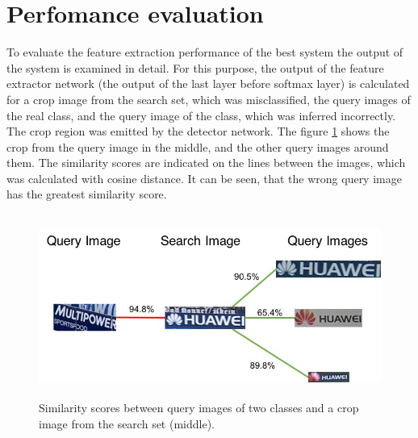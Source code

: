 \section{Perfomance evaluation}
To evaluate the feature extraction performance of the best system the output of the system is examined in detail. For this purpose, the output of the feature extractor network (the output of the last layer before softmax layer) is calculated for a crop image from the search set, which was misclassified, the query images of the real class, and the query image of the class, which was inferred incorrectly. The crop region was emitted by the detector network. The figure \ref{f:misclass} shows the crop from the query image in the middle, and the other query images around them. The similarity scores are indicated on the lines between the images, which was calculated with cosine distance. It can be seen, that the wrong query image has the greatest similarity score.
\begin{figure}
  \centering
  \includegraphics[height=60mm]{images/mt/misclass.jpg}
  \caption{Similarity scores between query images of two classes and a crop image from the search set (middle).}
  \label{f:misclass}
\end{figure}

